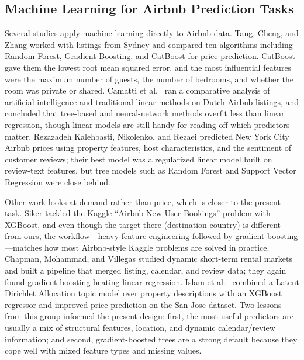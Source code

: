 \documentclass[journal]{IEEEtran}
\begin{document}
\subsection{Machine Learning for Airbnb Prediction Tasks}
Several studies apply machine learning directly to Airbnb data. Tang, Cheng, and
Zhang \cite{tang2024} worked with listings from Sydney and compared ten
algorithms including Random Forest, Gradient Boosting, and CatBoost for price
prediction. CatBoost gave them the lowest root mean squared error, and the most
influential features were the maximum number of guests, the number of bedrooms,
and whether the room was private or shared. Camatti et al.\ \cite{camatti2024}
ran a comparative analysis of artificial-intelligence and traditional linear
methods on Dutch Airbnb listings, and concluded that tree-based and
neural-network methods overfit less than linear regression, though linear models
are still handy for reading off which predictors matter. Rezazadeh Kalehbasti,
Nikolenko, and Rezaei \cite{kalehbasti2019} predicted New York City Airbnb
prices using property features, host characteristics, and the sentiment of
customer reviews; their best model was a regularized linear model built on
review-text features, but tree models such as Random Forest and Support Vector
Regression were close behind.

Other work looks at demand rather than price, which is closer to the present task.
Siker \cite{siker2018} tackled the Kaggle ``Airbnb New User Bookings'' problem
with XGBoost, and even though the target there (destination country) is
different from ours, the workflow---heavy feature engineering followed by
gradient boosting---matches how most Airbnb-style Kaggle problems are solved in
practice. Chapman, Mohammad, and Villegas \cite{chapman2023} studied dynamic
short-term rental markets and built a pipeline that merged listing, calendar,
and review data; they again found gradient boosting beating linear regression.
Islam et al.\ \cite{islam2022} combined a Latent Dirichlet Allocation topic
model over property descriptions with an XGBoost regressor and improved price
prediction on the San Jose dataset. Two lessons from this group informed the
present design: first, the most useful predictors are usually a mix of structural
features, location, and dynamic calendar/review information; and second,
gradient-boosted trees are a strong default because they cope well with mixed
feature types and missing values.
\end{document}
